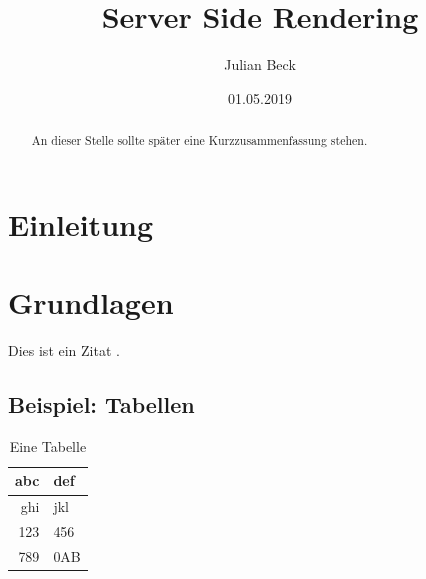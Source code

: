 \documentclass[runningheads]{llncs}
\title{Server Side Rendering}
\author{Julian Beck}
\institute{Betreuer: Prof. Dr. rer. nat. Christian Zirpins}
\date{01.05.2019}
\begin{document}
\let\oldaddcontentsline\addcontentsline
\def\addcontentsline#1#2#3{}
\maketitle
\def\addcontentsline#1#2#3{\oldaddcontentsline{#1}{#2}{#3}}


\begin{abstract}
  An dieser Stelle sollte später eine Kurzzusammenfassung stehen.
\end{abstract}

\tableofcontents 
\newpage

\section{Einleitung}
\label{sec:Einleitung}

\lipsum


\section{Grundlagen}
\label{sec:Grundlagen}

\lipsum[1-2]

Dies ist ein Zitat \cite{becker2008a}.

\subsection{Beispiel: Tabellen}
\label{subsec:Tables}

\lipsum[3]

\begin{table}[h]
  \centering
  \caption{Eine Tabelle}
  \label{tab:atable}
  \begin{tabular}{|r|l|} \hline
    abc & def\\ \hline
    ghi & jkl\\ \hline
    123 & 456\\ \hline
    789 & 0AB\\ \hline
  \end{tabular}
\end{table}

\lipsum[4]
\end{document}
